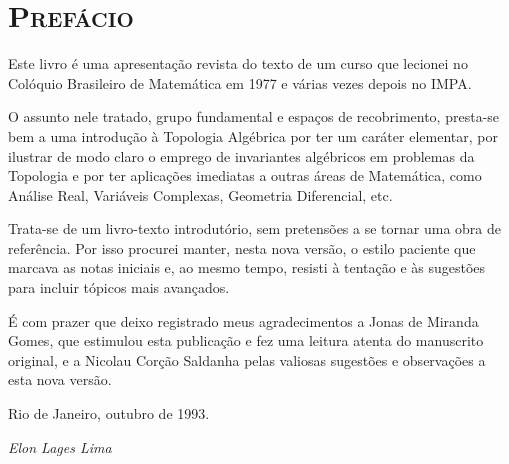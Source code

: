 \chapter*{\scshape Prefácio}

Este livro é uma apresentação revista do texto de um curso que
lecionei no Colóquio Brasileiro de Matemática em 1977 e várias vezes
depois no IMPA.

O assunto nele tratado, grupo fundamental e espaços de recobrimento,
presta-se bem a uma introdução à Topologia Algébrica por ter um 
caráter elementar, por ilustrar de modo claro o emprego de invariantes
algébricos em problemas da Topologia e por ter aplicações imediatas
a outras áreas de Matemática, como Análise Real, Variáveis Complexas,
Geometria Diferencial, etc.

Trata-se de um livro-texto introdutório, sem pretensões a se tornar
uma obra de referência. Por isso procurei manter, nesta nova versão,
o estilo paciente que marcava as notas iniciais e, ao mesmo tempo,
resisti à tentação e às sugestões para incluir tópicos mais avançados.

É com prazer que deixo registrado meus agradecimentos a Jonas de
Miranda Gomes, que estimulou esta publicação e fez uma leitura atenta
do manuscrito original, e a Nicolau Corção Saldanha pelas valiosas
sugestões e observações a esta nova versão.

\par\nobreak\smallskip\hfill
Rio de Janeiro, outubro de 1993.
\par\nobreak\smallskip\hfill
\textit{Elon Lages Lima}
